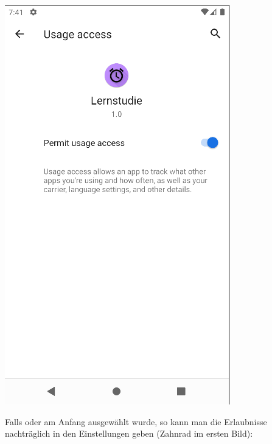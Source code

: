 \documentclass[ngerman]{tutorial}
\begin{document}
\begin{center}
    \includegraphics[scale=0.4]{item_per.png}
\end{center}
Falls  oder  am Anfang ausgewählt wurde, so kann man die Erlaubnisse nachträglich in den Einstellungen geben (Zahnrad im ersten Bild):
\end{document}

